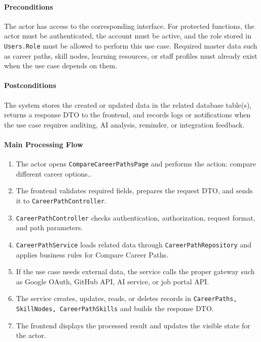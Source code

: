 \paragraph{Preconditions}

The actor has access to the corresponding interface. For protected functions, the actor must be authenticated, the account must be active, and the role stored in \texttt{Users.Role} must be allowed to perform this use case. Required master data such as career paths, skill nodes, learning resources, or staff profiles must already exist when the use case depends on them.

\paragraph{Postconditions}

The system stores the created or updated data in the related database table(s), returns a response DTO to the frontend, and records logs or notifications when the use case requires auditing, AI analysis, reminder, or integration feedback.

\paragraph{Main Processing Flow}

\begin{enumerate}
    \item The actor opens \texttt{CompareCareerPathsPage} and performs the action: compare different career options..
    \item The frontend validates required fields, prepares the request DTO, and sends it to \texttt{CareerPathController}.
    \item \texttt{CareerPathController} checks authentication, authorization, request format, and path parameters.
    \item \texttt{CareerPathService} loads related data through \texttt{CareerPathRepository} and applies business rules for Compare Career Paths.
    \item If the use case needs external data, the service calls the proper gateway such as Google OAuth, GitHub API, AI service, or job portal API.
    \item The service creates, updates, reads, or deletes records in \texttt{CareerPaths, SkillNodes, CareerPathSkills} and builds the response DTO.
    \item The frontend displays the processed result and updates the visible state for the actor.
\end{enumerate}

